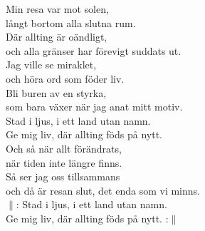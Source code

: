 \documentclass[a6paper, 10pt, twoside]{article}
\begin{document}
\noindent
\begin{center}
\end{center}
\begin{lyrics}
Min resa var mot solen, \\
långt bortom alla slutna rum. \\
Där allting är oändligt, \\
och alla gränser har förevigt suddats ut.
\vspace{5pt} \\
Jag ville se miraklet, \\
och höra ord som föder liv. \\
Bli buren av en styrka, \\ 
som bara växer när jag anat mitt motiv. %
\physicalonly{\vspace{5pt}} \\
Stad i ljus, i ett land utan namn. \\
Ge mig liv, där allting föds på nytt.
\vspace{5pt} \\
Och så när allt förändrats, \\
när tiden inte längre finns. \\
Så ser jag oss tillsammans \\
och då är resan slut, det enda som vi minns.
\vspace{5pt} \\
$\|$: Stad i ljus, i ett land utan namn. \\
Ge mig liv, där allting föds på nytt. :$\|$
\end{lyrics}
\end{document}
